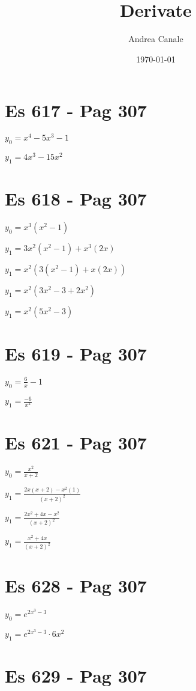 \documentclass[11pt]{article}
\title{ Derivate }
\author{ Andrea Canale }
\date{\today}
\begin{document}
\maketitle	

\section{Es 617 - Pag 307}

$ y_0 = x^4 - 5x^3 - 1 $

$ y_1 = 4x^3 - 15x^2 $

\section{Es 618 - Pag 307}

$ y_0 = x^3(x^2 - 1) $

$ y_1 = 3x^2(x^2 - 1) + x^3(2x) $

$ y_1 = x^2(3(x^2 - 1) + x(2x)) $

$ y_1 = x^2(3x^2 - 3 + 2x^2) $

$ y_1 = x^2(5x^2 - 3) $

\section{Es 619 - Pag 307}

$ y_0 = \frac{6}{x} - 1 $

$ y_1 = \frac{-6}{x^2} $

\section{Es 621 - Pag 307}

$ y_0 = \frac{x^2}{x + 2} $

$ y_1 = \frac{2x(x+2) - x^2(1)}{(x + 2)^2} $

$ y_1 = \frac{2x^2 + 4x - x^2}{(x + 2)^2} $

$ y_1 = \frac{x^2 + 4x}{(x + 2)^2} $

\section{Es 628 - Pag 307}

$ y_0 = e^{2x^3 - 3} $

$ y_1 = e^{2x^3 - 3} \cdot 6x^2 $

\section{Es 629 - Pag 307}
\end{document}
